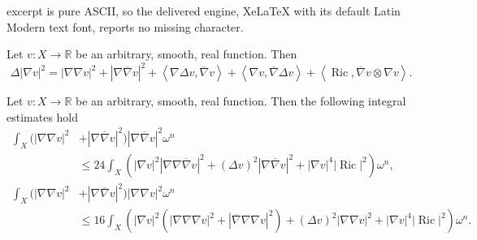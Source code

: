 \documentclass[10pt,a4paper]{amsart}
\DeclareMathOperator{\Ric}{Ric}
\newcommand{\R}{\mathbb{R}}
\newcommand{\ip}[1]{\left\langle#1\right\rangle}
\newcommand{\oo}[1]{\overline{#1}}
\begin{document}
excerpt is pure ASCII, so the delivered engine, XeLaTeX with its default Latin Modern text font, reports no missing character.
\begin{proposition}
Let $v: X \to \R$ be an arbitrary, smooth, real function. Then
\begin{equation}\label{Bochner_formula}
    \Delta |\nabla v|^2 = |\nabla \nabla v|^2 + |\nabla \oo{\nabla} v|^2 + \ip{\nabla \Delta v, \oo{\nabla} v} + \ip{\nabla v, \oo{\nabla} \Delta v} + \ip{\Ric, \oo{\nabla} v \otimes \nabla v}.
\end{equation}
\end{proposition}

\begin{proposition}
Let $v: X \to \R$ be an arbitrary, smooth, real function. Then the following integral estimates hold
\begin{align*}
     \int_X (|\nabla \nabla v|^2 &+ |\nabla \oo{\nabla} v|^2)|\nabla \oo{\nabla} v|^2 \omega^n\\ 
     &\leq 24 \int_X (|\nabla v|^2 |\nabla \nabla \oo{\nabla} v|^2 + (\Delta v)^2 |\nabla \oo{\nabla} v|^2 +|\nabla v|^4 |\Ric|^2) \omega^n,\\
    \int_X (|\nabla \nabla v|^2 &+ |\nabla \oo{\nabla} v|^2)|\nabla \nabla v|^2 \omega^n\\
    &\leq 16\int_X (|\nabla v|^2 (|\nabla \nabla \nabla v|^2 + |\oo{\nabla} \nabla \nabla v|^2) + (\Delta v)^2 |\nabla \nabla v|^2 + |\nabla v|^4|\Ric|^2)\omega^n.
\end{align*}
\end{proposition}
\end{document}
